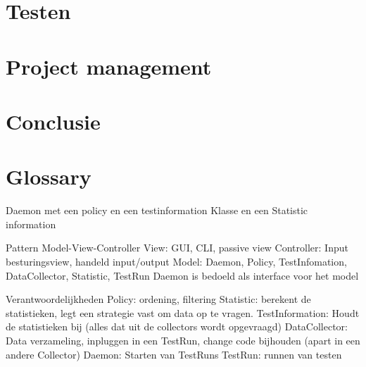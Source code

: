 \documentclass[i1]{oss}
\begin{document}
\section{Testen}
\label{ssec:testen}

\section{Project management}
\label{ssec:Projectmanag}


\section{Conclusie}
\label{ssec:Conclusie}


\section{Glossary}
\label{ssec:glossary}


Daemon met een policy en een testinformation Klasse en een Statistic information 

Pattern Model-View-Controller
View:  GUI, CLI, passive view
Controller:
Input besturingsview, handeld input/output
Model: Daemon, Policy, TestInfomation, DataCollector, Statistic, TestRun
Daemon is bedoeld als interface voor het model

Verantwoordelijkheden
Policy: ordening, filtering
Statistic: berekent de statistieken, legt een strategie vast om data op te vragen.
TestInformation:  Houdt de statistieken bij (alles dat uit de collectors wordt opgevraagd)
DataCollector: Data verzameling, inpluggen in een TestRun, change code bijhouden (apart in een andere Collector)
Daemon:  Starten van TestRuns
TestRun:  runnen van testen
\end{document}
